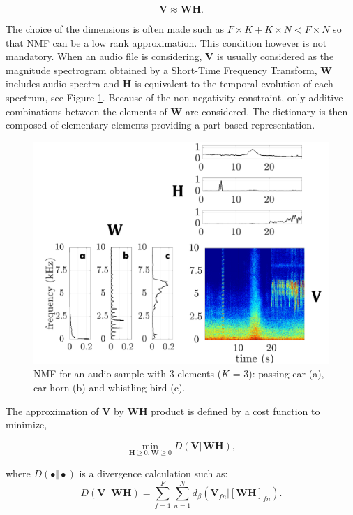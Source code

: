 \documentclass[review,5p,twocolumn,sort&compress,times]{elsarticle}
\begin{document}
\begin{equation}\label{eq:nmf}
\mathbf{V} \approx \mathbf{WH}.
\end{equation}

The choice of the dimensions is often made such as $F\times K + K \times N < F \times N$ so that NMF can be a low rank approximation. This condition however is not mandatory. When an audio file is considering, $\mathbf{V}$ is usually considered as the magnitude spectrogram obtained by a Short-Time Frequency Transform, $\mathbf{W}$ includes audio spectra and $\mathbf{H}$ is equivalent to the temporal evolution of each spectrum, see Figure \ref{fig:exampleNMF}. Because of the non-negativity constraint, only additive combinations between the elements of $\mathbf{W}$ are considered. The dictionary is then composed of elementary elements providing a part based representation.  

\begin{figure}[t]
\includegraphics[width=.9\linewidth]{./figures/schema_introduction_nmf.pdf} 
\caption{NMF for an audio sample with 3 elements ($K$ = 3): passing car (a), car horn (b) and whistling bird (c).}
\label{fig:exampleNMF}
\end{figure}

The approximation of $\mathbf{V}$ by $\mathbf{WH}$ product is defined by a cost function to minimize, 

\begin{equation}\label{eq:min-D-WH}
\underset{\mathbf{H} \geq 0, \mathbf{W} \geq 0}{\min} D\left(\mathbf{V} \Vert \mathbf{WH}\right), 
\end{equation}

where $D(\bullet \Vert \bullet)$ is a divergence calculation such as:
\begin{equation}
D\left(\textbf{V} \vert\vert \mathbf{WH} \right) = \sum_{f = 1}^{F} \sum_{n = 1}^{N} d_{\beta}
\left(\textbf{V}_{fn} \vert \left[ \textbf{WH} \right]_{fn} \right).
\end{equation}
\end{document}
